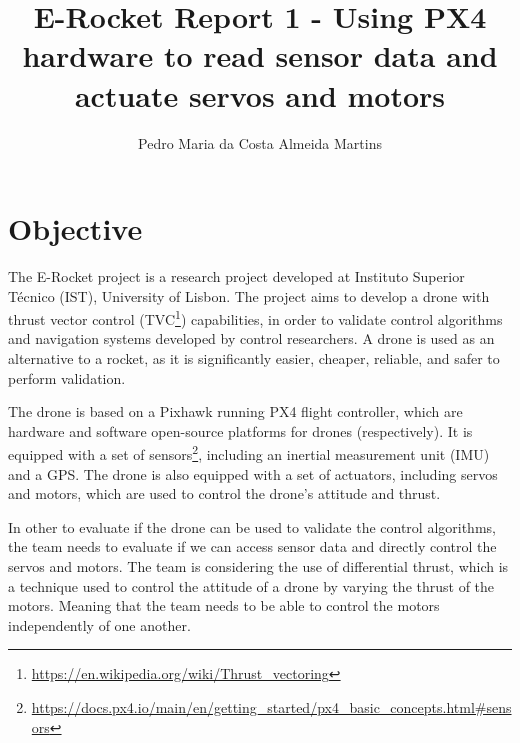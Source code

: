 \documentclass[a4paper]{article}
\begin{document}
\title{E-Rocket Report 1 - Using PX4 hardware to read sensor data and actuate servos and motors}
\author{Pedro Maria da Costa Almeida Martins}

\maketitle
\thispagestyle{empty}
\clearpage


\tableofcontents
\thispagestyle{empty}
\clearpage



\section{Objective}

The E-Rocket project is a research project developed at Instituto Superior Técnico (IST), University of Lisbon. 
The project aims to develop a drone with thrust vector control (TVC\footnote{\url{https://en.wikipedia.org/wiki/Thrust_vectoring}}) capabilities, in order to validate control algorithms and navigation systems developed by control researchers. 
A drone is used as an alternative to a rocket, as it is significantly easier, cheaper, reliable, and safer to perform validation.

The drone is based on a Pixhawk running PX4 flight controller, which are hardware and software open-source platforms for drones (respectively). 
It is equipped with a set of sensors\footnote{\url{https://docs.px4.io/main/en/getting_started/px4_basic_concepts.html\#sensors}}, including an inertial measurement unit (IMU) and a GPS. 
The drone is also equipped with a set of actuators, including servos and motors, which are used to control the drone's attitude and thrust.

In other to evaluate if the drone can be used to validate the control algorithms, the team needs to evaluate if we can access sensor data and directly control the servos and motors. 
The team is considering the use of differential thrust, which is a technique used to control the attitude of a drone by varying the thrust of the motors. Meaning that the team needs to be able to control the motors independently of one another.
\end{document}
